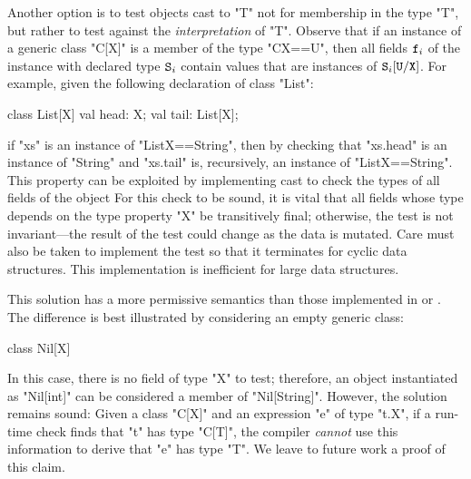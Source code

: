 Another option is to test objects cast to \xcd"T" not for membership in the
type \xcd"T", but rather to test against the
\emph{interpretation} of \xcd"T".
Observe that
if an instance of a generic class \xcd"C[X]"
is a member of the type \xcd"C{X==U}", then
all fields ${\tt f}_i$ of the instance with
declared type ${\tt S}_i$ contain values
that are instances of ${\tt S}_i[{\tt U}/{\tt X}]$.
For example, given the following declaration of class \xcd"List":
{
\begin{xten}
class List[X] {
  val head: X;
  val tail: List[X];
}
\end{xten}
}
\noindent
if \xcd"xs" is an instance of \xcd"List{X==String}", then
by checking that \xcd"xs.head" is an instance of \xcd"String"
and \xcd"xs.tail" is, recursively, an instance of \xcd"List{X==String}".
This property can be exploited by implementing cast to check the
types of all fields of the object
For this check to be sound, it is vital that all fields whose
type depends on the type property \xcd"X" be transitively final;
otherwise, the test is not invariant---the
result of the test could change as the data is mutated.
Care must also be taken to implement the
test so that it terminates for cyclic data structures.
This implementation is inefficient for large data structures.

This solution has a more permissive semantics
than those implemented in \Xten or \FXG.
The difference is best illustrated by considering an empty generic class:
{
\begin{xten}
class Nil[X] { }
\end{xten}
}
\noindent
In this case, there is no field of type \xcd"X" to test;
therefore, an object instantiated as \xcd"Nil[int]" 
can be considered a member of \xcd"Nil[String]". 
However, the solution remains sound:
Given a class \xcd"C[X]" and an expression \xcd"e" of type \xcd"t.X", if
a run-time check finds that \xcd"t" has type \xcd"C[T]", 
the compiler \emph{cannot} use this information to derive 
that \xcd"e" has type \xcd"T".
We leave to future work a proof of this claim.
